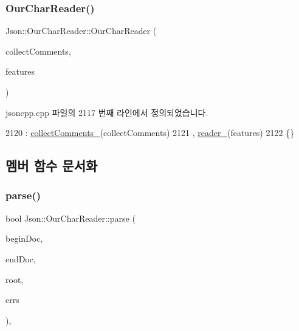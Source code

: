 \subsubsection{\texorpdfstring{Our\+Char\+Reader()}{OurCharReader()}}
{\footnotesize\ttfamily Json\+::\+Our\+Char\+Reader\+::\+Our\+Char\+Reader (\begin{DoxyParamCaption}\item[{bool}]{collect\+Comments,  }\item[{\hyperlink{class_json_1_1_our_features}{Our\+Features} const \&}]{features }\end{DoxyParamCaption})\hspace{0.3cm}{\ttfamily [inline]}}



jsoncpp.\+cpp 파일의 2117 번째 라인에서 정의되었습니다.


\begin{DoxyCode}
2120   : \hyperlink{class_json_1_1_our_char_reader_aa6afd3d0f754cadad0f6d2be38bcfee0}{collectComments\_}(collectComments)
2121   , \hyperlink{class_json_1_1_our_char_reader_aedd4520b8570654ed7aa0726075ee58d}{reader\_}(features)
2122   \{\}
\end{DoxyCode}


\subsection{멤버 함수 문서화}
\mbox{\label{class_json_1_1_our_char_reader_a547f08ec5a9951ca69e8bb2e90296c83}} 
\subsubsection{\texorpdfstring{parse()}{parse()}}
{\footnotesize\ttfamily bool Json\+::\+Our\+Char\+Reader\+::parse (\begin{DoxyParamCaption}\item[{char const $\ast$}]{begin\+Doc,  }\item[{char const $\ast$}]{end\+Doc,  }\item[{\hyperlink{class_json_1_1_value}{Value} $\ast$}]{root,  }\item[{\hyperlink{json_8h_a1e723f95759de062585bc4a8fd3fa4be}{J\+S\+O\+N\+C\+P\+P\+\_\+\+S\+T\+R\+I\+NG} $\ast$}]{errs }\end{DoxyParamCaption})\hspace{0.3cm}{\ttfamily [inline]}, {\ttfamily [virtual]}}



